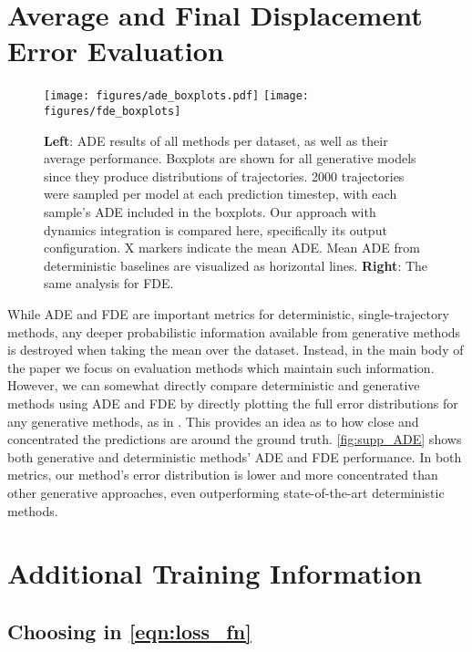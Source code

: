 \documentclass[runningheads]{llncs}
\begin{document}
\section{Average and Final Displacement Error Evaluation} \label{sec:supp_ADE}

\begin{figure}[t]
    \centering
    \texttt{[image: figures/ade\_boxplots.pdf]}
    \texttt{[image: figures/fde\_boxplots]}
    \caption{\textbf{Left}: ADE results of all methods per dataset, as well as their average performance. Boxplots are shown for all generative models since they produce distributions of trajectories. 2000 trajectories were sampled per model at each prediction timestep, with each sample’s ADE included in the boxplots. Our approach with dynamics integration is compared here, specifically its  output configuration. X markers indicate the mean ADE. Mean ADE from deterministic baselines are visualized as horizontal lines. \textbf{Right}: The same analysis for FDE.}
    \label{fig:supp_ADE}
    \label{fig:supp_FDE}
    \vspace{3mm}
\end{figure}

While ADE and FDE are important metrics for deterministic, single-trajectory methods, any deeper probabilistic information available from generative methods is destroyed when taking the mean over the dataset. Instead, in the main body of the paper we focus on evaluation methods which maintain such information. However, we can somewhat directly compare deterministic and generative methods using ADE and FDE by directly plotting the full error distributions for any generative methods, as in \cite{IvanovicPavone2019}. This provides an idea as to how close and concentrated the predictions are around the ground truth. \cref{fig:supp_ADE} shows both generative and deterministic methods' ADE and FDE performance. In both metrics, our method's error distribution is lower and more concentrated than other generative approaches, even outperforming state-of-the-art deterministic methods. 







\section{Additional Training Information}

\subsection{Choosing  in \cref{eqn:loss_fn}}
\end{document}
